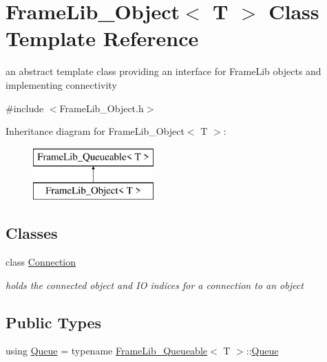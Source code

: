 \hypertarget{class_frame_lib___object}{}\section{Frame\+Lib\+\_\+\+Object$<$ T $>$ Class Template Reference}
\label{class_frame_lib___object}


an abstract template class providing an interface for Frame\+Lib objects and implementing connectivity  




{\ttfamily \#include $<$Frame\+Lib\+\_\+\+Object.\+h$>$}

Inheritance diagram for Frame\+Lib\+\_\+\+Object$<$ T $>$\+:\begin{figure}[H]
\begin{center}
\leavevmode
\includegraphics[height=2.000000cm]{class_frame_lib___object}
\end{center}
\end{figure}
\subsection*{Classes}
\begin{DoxyCompactItemize}
\item 
class \hyperlink{struct_frame_lib___object_1_1_connection}{Connection}
\begin{DoxyCompactList}\small\item\em holds the connected object and IO indices for a connection to an object \end{DoxyCompactList}\end{DoxyCompactItemize}
\subsection*{Public Types}
\begin{DoxyCompactItemize}
\item 
using \hyperlink{class_frame_lib___object_a3e6fce9a979bf08406e40e51583cb4ea}{Queue} = typename \hyperlink{class_frame_lib___queueable}{Frame\+Lib\+\_\+\+Queueable}$<$ T $>$\+::\hyperlink{class_frame_lib___object_a3e6fce9a979bf08406e40e51583cb4ea}{Queue}
\end{DoxyCompactItemize}
